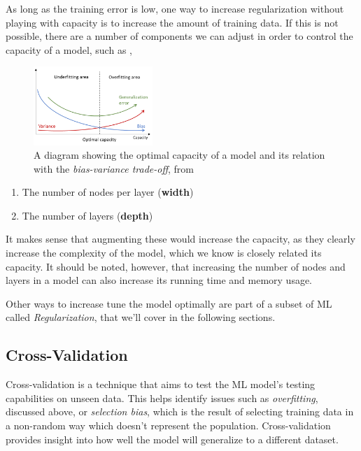 \documentclass{article}
\begin{document}
  As long as the training error is low, one way to increase regularization without playing with capacity is to increase the amount of training data. If this is not possible, there are a number of components we can adjust in order to control the capacity of a model, such as \citep{capacity-Brownlee}, 
\begin{figure} %
    \centering
    \label{capacity}
    \includegraphics[width=0.4\textwidth]{capacity}
    \caption{A diagram showing the optimal capacity of a model and its relation with the \textit{bias-variance trade-off}, from \citep{capacity-Kowalik}}
\end{figure}
  \begin{enumerate}
    \item The number of nodes per layer (\textbf{width}) 
    \item The number of layers (\textbf{depth})
  \end{enumerate}
  It makes sense that augmenting these would increase the capacity, as they clearly increase the complexity of the model, which we know is closely related its capacity. It should be noted, however, that increasing the number of nodes and layers in a model can also increase its running time and memory usage. 

  Other ways to increase tune the model optimally are part of a subset of ML called \textit{Regularization}, that we'll cover in the following sections. 

  \subsection{Cross-Validation}%
  \label{sub:Cross-Validation}
Cross-validation is a technique that aims to test the ML model's testing capabilities on unseen data. This helps identify issues such as \textit{overfitting}, discussed above, or \textit{selection bias}, which is the result of selecting training data in a non-random way which doesn't represent the population. Cross-validation provides insight into how well the model will generalize to a different dataset.
\end{document}
